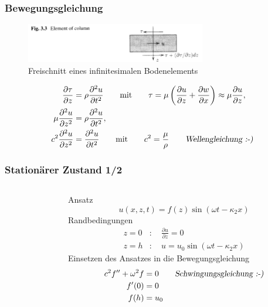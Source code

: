 \documentclass[hyperref={pdfpagemode=FullScreen, colorlinks=false}]{beamer}
\begin{document}
\begin{frame}
\frametitle{Bewegungsgleichung}
\begin{figure}
\includegraphics[width=0.7\textwidth]{fig_pdf/earthquake_inf_element}
\caption*{Freischnitt eines infinitesimalen Bodenelements \cite{Verruijt2010}}
\end{figure}
\begin{align*}
 \frac{\partial \tau}{\partial z} &= \rho \frac{\partial^2 u}{\partial t^2}
 \qquad \text{mit} \qquad \tau=\mu \left(\frac{\partial u}{\partial z} +  \frac{\partial w}{\partial x} \right)\approx \mu \frac{\partial u}{\partial z},\\
 \mu \frac{\partial^2 u}{\partial z^2} &= \rho \frac{\partial^2 u}{\partial t^2},\\
 c^2\frac{\partial^2 u}{\partial z^2} &= \frac{\partial^2 u}{\partial t^2}
 \qquad \text{mit} \qquad c^2=\frac{\mu}{\rho}  \qquad \text{\textsl{Wellengleichung :-)}}
\end{align*}
\end{frame}


\begin{frame}
\frametitle{Stationärer Zustand 1/2}
\begin{columns}
\begin{column}[t]{.1\linewidth}

\end{column}
\begin{column}[b]{.9\linewidth}
Ansatz
\begin{equation*}
u(x,z,t) = f(z) \sin(\omega t - \kappa_2 x) 
\end{equation*}
Randbedingungen
\begin{align*}
z=0 &:\quad \frac{\partial u}{\partial z}=0\\
z=h &:\quad u=u_0 \sin(\omega t - \kappa_2 x)
\end{align*}
Einsetzen des Ansatzes in die Bewegungsgleichung
\begin{align*}
 c^2 f''+\omega^2 f &=0 \qquad \text{\textsl{Schwingungsgleichung :-)}}\\
 f'(0) &=0\\
 f(h) &= u_0
\end{align*}
\end{column}
\end{columns}
\end{frame}
\end{document}

